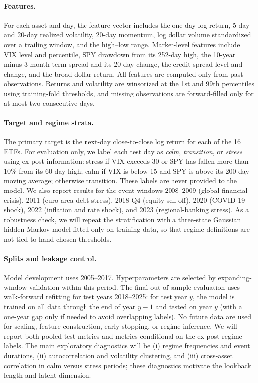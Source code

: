 \documentclass{article}
\begin{document}
\paragraph{Features.}
For each asset and day, the feature vector includes the one-day log return, 5-day and 20-day realized volatility, 20-day momentum, log dollar volume standardized over a trailing window, and the high--low range. Market-level features include VIX level and percentile, SPY drawdown from its 252-day high, the 10-year minus 3-month term spread and its 20-day change, the credit-spread level and change, and the broad dollar return. All features are computed only from past observations. Returns and volatility are winsorized at the 1st and 99th percentiles using training-fold thresholds, and missing observations are forward-filled only for at most two consecutive days.

\paragraph{Target and regime strata.}
The primary target is the next-day close-to-close log return for each of the 16 ETFs. For evaluation only, we label each test day as \emph{calm}, \emph{transition}, or \emph{stress} using ex post information: stress if VIX exceeds 30 or SPY has fallen more than 10\% from its 60-day high; calm if VIX is below 15 and SPY is above its 200-day moving average; otherwise transition. These labels are never provided to the model. We also report results for the event windows 2008--2009 (global financial crisis), 2011 (euro-area debt stress), 2018 Q4 (equity sell-off), 2020 (COVID-19 shock), 2022 (inflation and rate shock), and 2023 (regional-banking stress). As a robustness check, we will repeat the stratification with a three-state Gaussian hidden Markov model fitted only on training data, so that regime definitions are not tied to hand-chosen thresholds.

\paragraph{Splits and leakage control.}
Model development uses 2005--2017. Hyperparameters are selected by expanding-window validation within this period. The final out-of-sample evaluation uses walk-forward refitting for test years 2018--2025: for test year $y$, the model is trained on all data through the end of year $y-1$ and tested on year $y$ (with a one-year gap only if needed to avoid overlapping labels). No future data are used for scaling, feature construction, early stopping, or regime inference. We will report both pooled test metrics and metrics conditional on the ex post regime labels. The main exploratory diagnostics will be (i) regime frequencies and event durations, (ii) autocorrelation and volatility clustering, and (iii) cross-asset correlation in calm versus stress periods; these diagnostics motivate the lookback length and latent dimension.
\end{document}
